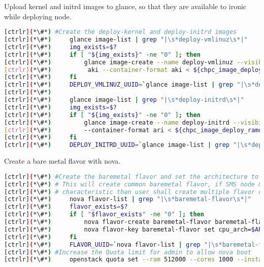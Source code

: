 	Upload kernel and initrd images to glance, so that they are available to ironic while deploying node.


\begin{lstlisting}[language=bash,keywords={}]
[ctrlr](*\#*) #Create the deploy-kernel and deploy-initrd images
[ctrlr](*\#*)     glance image-list | grep "|\s*deploy-vmlinuz\s*|"
[ctrlr](*\#*)     img_exists=$?
[ctrlr](*\#*)     if [ "${img_exists}" -ne "0" ]; then
[ctrlr](*\#*)         glance image-create --name deploy-vmlinuz --visibility public --disk-format \
[ctrlr](*\#*)          aki --container-format aki < ${chpc_image_deploy_kernel}
[ctrlr](*\#*)     fi
[ctrlr](*\#*)     DEPLOY_VMLINUZ_UUID=`glance image-list | grep "|\s*deploy-vmlinuz\s*|" | awk '{print $2}'`
[ctrlr](*\#*) 
[ctrlr](*\#*)     glance image-list | grep "|\s*deploy-initrd\s*|"
[ctrlr](*\#*)     img_exists=$?
[ctrlr](*\#*)     if [ "${img_exists}" -ne "0" ]; then
[ctrlr](*\#*)         glance image-create --name deploy-initrd --visibility public --disk-format ari \
[ctrlr](*\#*)         --container-format ari < ${chpc_image_deploy_ramdisk}
[ctrlr](*\#*)     fi
[ctrlr](*\#*)     DEPLOY_INITRD_UUID=`glance image-list | grep "|\s*deploy-initrd\s*|" | awk '{print $2}'`
\end{lstlisting} 

	Create a bare metal flavor with nova.


\begin{lstlisting}[language=bash,keywords={}]
[ctrlr](*\#*) #Create the baremetal flavor and set the architecture to x86_64
[ctrlr](*\#*) # This will create common baremetal flavor, if SMS node & compute has different
[ctrlr](*\#*) # characteristic than user shall create multiple flavor one each characterisitc
[ctrlr](*\#*)     nova flavor-list | grep "|\s*baremetal-flavor\s*|"
[ctrlr](*\#*)     flavor_exists=$?
[ctrlr](*\#*)     if [ "$flavor_exists" -ne "0" ]; then
[ctrlr](*\#*)         nova flavor-create baremetal-flavor baremetal-flavor ${RAM_MB} ${DISK_GB} ${CPU}
[ctrlr](*\#*)         nova flavor-key baremetal-flavor set cpu_arch=$ARCH
[ctrlr](*\#*)     fi
[ctrlr](*\#*)     FLAVOR_UUID=`nova flavor-list | grep "|\s*baremetal-flavor\s*|" | awk '{print $2}'`
[ctrlr](*\#*) #Increase the Quota limit for admin to allow nova boot
[ctrlr](*\#*)     openstack quota set --ram 512000 --cores 1000 --instances 100 admin
\end{lstlisting} 

